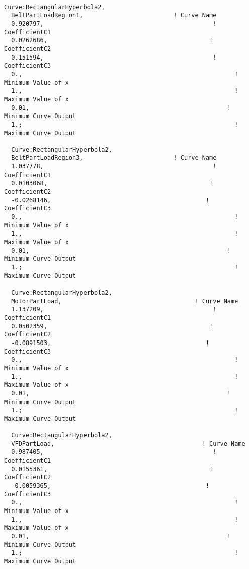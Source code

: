 \begin{lstlisting}

Curve:RectangularHyperbola2,
  BeltPartLoadRegion1,                         ! Curve Name
  0.920797,                                               ! CoefficientC1
  0.0262686,                                             ! CoefficientC2
  0.151594,                                               ! CoefficientC3
  0.,                                                           ! Minimum Value of x
  1.,                                                           ! Maximum Value of x
  0.01,                                                       ! Minimum Curve Output
  1.;                                                           ! Maximum Curve Output

  Curve:RectangularHyperbola2,
  BeltPartLoadRegion3,                         ! Curve Name
  1.037778,                                               ! CoefficientC1
  0.0103068,                                             ! CoefficientC2
  -0.0268146,                                           ! CoefficientC3
  0.,                                                           ! Minimum Value of x
  1.,                                                           ! Maximum Value of x
  0.01,                                                       ! Minimum Curve Output
  1.;                                                           ! Maximum Curve Output

  Curve:RectangularHyperbola2,
  MotorPartLoad,                                     ! Curve Name
  1.137209,                                               ! CoefficientC1
  0.0502359,                                             ! CoefficientC2
  -0.0891503,                                           ! CoefficientC3
  0.,                                                           ! Minimum Value of x
  1.,                                                           ! Maximum Value of x
  0.01,                                                       ! Minimum Curve Output
  1.;                                                           ! Maximum Curve Output

  Curve:RectangularHyperbola2,
  VFDPartLoad,                                         ! Curve Name
  0.987405,                                               ! CoefficientC1
  0.0155361,                                             ! CoefficientC2
  -0.0059365,                                           ! CoefficientC3
  0.,                                                           ! Minimum Value of x
  1.,                                                           ! Maximum Value of x
  0.01,                                                       ! Minimum Curve Output
  1.;                                                           ! Maximum Curve Output
\end{lstlisting}

